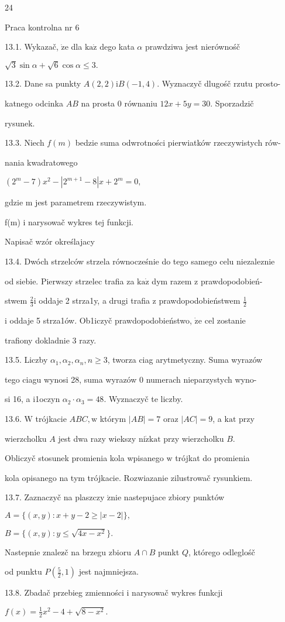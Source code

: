 \documentclass[a4paper,12pt]{article}
\begin{document}
24

Praca kontrolna nr 6

13.1. Wykazač, $\dot{\mathrm{z}}\mathrm{e}$ dla $\mathrm{k}\mathrm{a}\dot{\mathrm{z}}$ dego kata $\alpha$ prawdziwa jest nierównośč

$\sqrt{3}\sin\alpha+\sqrt{6}\cos\alpha\leq 3.$

13.2. Dane sa punkty $A(2,2)\mathrm{i}B(-1,4)$. Wyznaczyč dlugośč rzutu prosto-

katnego odcinka $AB$ na prosta $0$ równaniu $12x+5y=30$. Sporzadzič

rysunek.

13.3. Niech $f(m)$ bedzie suma odwrotności pierwiatków rzeczywistych rów-

nania kwadratowego

$(2^{m}-7)x^{2}-|2^{m+1}-8|x+2^{m}=0,$

gdzie m jest parametrem rzeczywistym.

f(m) i narysowač wykres tej funkcji.

Napisač wzór określajacy

13.4. Dwóch strzelców strzela równocześnie do tego samego celu niezaleznie

od siebie. Pierwszy strzelec trafia za $\mathrm{k}\mathrm{a}\dot{\mathrm{z}}$ dym razem $\mathrm{z}$ prawdopodobień-

stwem $\displaystyle \frac{2}{3}\mathrm{i}$ oddaje 2 strza1y, a drugi trafia $\mathrm{z}$ prawdopodobieństwem $\displaystyle \frac{1}{2}$

$\mathrm{i}$ oddaje 5 strza1ów. Ob1iczyč prawdopodobieństwo, $\dot{\mathrm{z}}\mathrm{e}$ cel zostanie

trafiony dokladnie 3 razy.

13.5. Liczby $\alpha_{1}, \alpha_{2}, \alpha_{n}, n\geq 3$, tworza ciag arytmetyczny. Suma wyrazów

tego ciagu wynosi 28, suma wyrazów $0$ numerach nieparzystych wyno-

si 16, a i1oczyn $\alpha_{2}\cdot\alpha_{3}=48$. Wyznaczyč te liczby.

13.6. $\mathrm{W}$ trójkacie $ABC, \mathrm{w}$ którym $|AB| = 7$ oraz $|AC| =9$, a $\mathrm{k}\mathrm{a}\mathrm{t}$ przy

wierzcholku $A$ jest dwa razy wiekszy $\mathrm{n}\mathrm{i}\dot{\mathrm{z}} \mathrm{k}\mathrm{a}\mathrm{t}$ przy wierzcholku $B.$

Obliczyč stosunek promienia kola wpisanego $\mathrm{w}$ trójkat do promienia

kola opisanego na tym trójkacie. Rozwiazanie zilustrowač rysunkiem.

13.7. Zaznaczyč na plaszczy $\acute{\mathrm{z}}\mathrm{n}\mathrm{i}\mathrm{e}$ nastepujace zbiory punktów

$A=\{(x,y):x+y-2\geq|x-2|\},$

$B=\{(x,y):y\leq\sqrt{4x-x^{2}}\}.$

Nastepnie znalez$\acute{}$č na brzegu zbioru $A\cap B$ punkt $Q$, którego odleglośč

od punktu $P(\displaystyle \frac{5}{2},1)$ jest najmniejsza.

13.8. Zbadač przebieg zmienności $\mathrm{i}$ narysowač wykres funkcji

$f(x)=\displaystyle \frac{1}{2}x^{2}-4+\sqrt{8-x^{2}}.$
\end{document}
